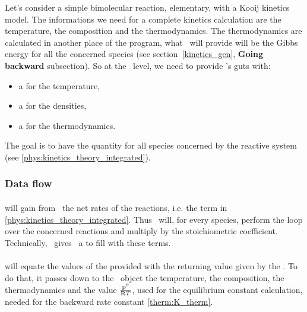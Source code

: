 Let's consider a simple bimolecular reaction, elementary,
with a Kooij kinetics model. The informations we need for
a complete kinetics calculation are the temperature, the
composition and the thermodynamics. The thermodynamics are
calculated in another place of the program, what \Antioch\
will provide will be the Gibbs energy for all the concerned
species (see section~\ref{kinetics_gen}, \textbf{Going backward}
subsection). So at the \KineticsEvaluator\ level, we need
to provide \Antioch's guts with:
\begin{itemize}
\item a  for the temperature,
\item a  for
                the densities,
\item a  for
                the thermodynamics.
\end{itemize}

The goal is to have the quantity  for all species  concerned by the 
reactive system (see \ref{phys:kinetics_theory_integrated}).

\subsubsection{Data flow}

\paragraph{\KineticsEvaluator}
will gain from \ReactionSet\ the net rates of
the reactions,  i.e. the term \rate[r] in \ref{phys:kinetics_theory_integrated}.
Thus \KineticsEvaluator\ will, for every species, perform the loop
over the concerned reactions and multiply by the stoichiometric coefficient.
Technically, \KineticsEvaluator\ gives \ReactionSet\ a \prog{VectorCoeffType}
to fill with these terms.

\paragraph{\ReactionSet}
will equate the values of the provided  with
the returning value given by the \Reaction. To do that, it passes down to
the \Reaction\ object the temperature, the composition, the thermodynamics and
the value $\frac{\pz}{\Rg \Temp}$, used for the equilibrium constant calculation,
needed for the backward rate constant \eqref{therm:K_therm}.

